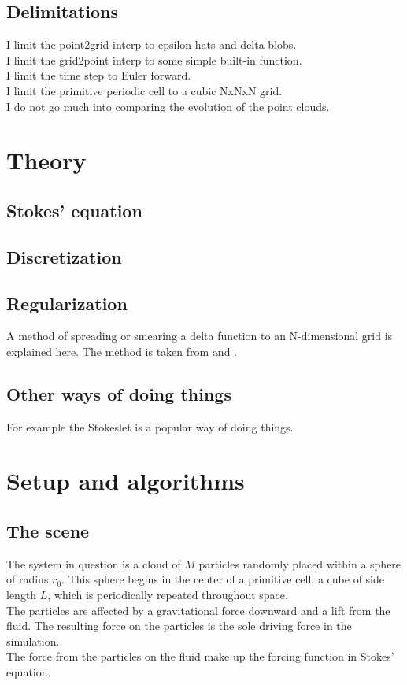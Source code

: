 \documentclass[a4paper,twoside=false,abstract=false,numbers=noenddot,
titlepage=false,headings=small,parskip=half,version=last]{scrartcl}
\begin{document}
\subsection{Delimitations}
I limit the point2grid interp to epsilon hats and delta blobs.\\
I limit the grid2point interp to some simple built-in function.\\
I limit the time step to Euler forward.\\
I limit the primitive periodic cell to a cubic NxNxN grid.\\
I do not go much into comparing the evolution of the point clouds.\\
\section{Theory}
\subsection{Stokes' equation}
\subsection{Discretization}
\subsection{Regularization}
A method of spreading or smearing a delta function to an N-dimensional grid is explained here. The method is taken from \cite{spectralewald} and \cite{interfaceregularization}.
\subsection{Other ways of doing things}
For example the Stokeslet is a popular way of doing things.

\section{Setup and algorithms}
\subsection{The scene}
The system in question is a cloud of $M$ particles randomly placed within a sphere of radius $r_0$. This sphere begins in the center of a primitive cell, a cube of side length $L$, which is periodically repeated throughout space.\\
The particles are affected by a gravitational force downward and a lift from the fluid. The resulting force on the particles is the sole driving force in the simulation.\\
The force from the particles on the fluid make up the forcing function in Stokes' equation.
\end{document}

